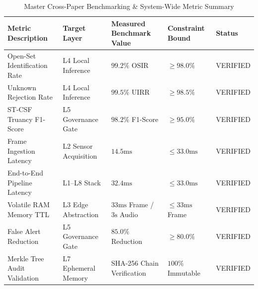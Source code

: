 \documentclass[12pt,a4paper,oneside]{report}
\begin{document}
\begin{table}[htbp]
\caption{Master Cross-Paper Benchmarking & System-Wide Metric Summary}
\label{tab:master_benchmarks}
\centering
{}
\fontsize{9}{11}\selectfont
\begin{tabular}{@{}lllll@{}}
\toprule
\textbf{Metric Description} & \textbf{Target Layer} & \textbf{Measured Benchmark Value} & \textbf{Constraint Bound} & \textbf{Status} \\
\midrule
Open-Set Identification Rate & L4 Local Inference & $99.2\%$ OSIR & $\ge 98.0\%$ & VERIFIED \\
Unknown Rejection Rate & L4 Local Inference & $99.5\%$ UIRR & $\ge 98.5\%$ & VERIFIED \\
ST-CSF Truancy F1-Score & L5 Governance Gate & $98.2\%$ F1-Score & $\ge 95.0\%$ & VERIFIED \\
Frame Ingestion Latency & L2 Sensor Acquisition & $14.5\text{ms}$ & $\le 33.0\text{ms}$ & VERIFIED \\
End-to-End Pipeline Latency & L1--L8 Stack & $32.4\text{ms}$ & $\le 33.0\text{ms}$ & VERIFIED \\
Volatile RAM Memory TTL & L3 Edge Abstraction & $33\text{ms}$ Frame / $3\text{s}$ Audio & $\le 33\text{ms}$ Frame & VERIFIED \\
False Alert Reduction & L5 Governance Gate & $85.0\%$ Reduction & $\ge 80.0\%$ & VERIFIED \\
Merkle Tree Audit Validation & L7 Ephemeral Memory & SHA-256 Chain Verification & $100\%$ Immutable & VERIFIED \\
\bottomrule
\end{tabular}
\end{table}
\end{document}
